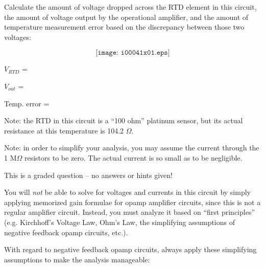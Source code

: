 
Calculate the amount of voltage dropped across the RTD element in this circuit, the amount of voltage output by the operational amplifier, and the amount of temperature measurement error based on the discrepancy between those two voltages:

$$\texttt{[image: i00041x01.eps]}$$

$V_{RTD}$ = \underbar{\hskip 50pt}

\vskip 10pt

$V_{out}$ = \underbar{\hskip 50pt}

\vskip 10pt

Temp. error = \underbar{\hskip 50pt}

\vskip 20pt

Note: the RTD in this circuit is a ``100 ohm'' platinum sensor, but its actual resistance at this temperature is 104.2 $\Omega$.

\vfil 

Note: in order to simplify your analysis, you may assume the current through the 1 M$\Omega$ resistors to be zero.  The actual current is so small as to be negligible.

\eject






This is a graded question -- no answers or hints given!







You will {\it not} be able to solve for voltages and currents in this circuit by simply applying memorized gain formulae for opamp amplifier circuits, since this is not a regular amplifier circuit.  Instead, you must analyze it based on ``first principles'' (e.g. Kirchhoff's Voltage Law, Ohm's Law, the simplifying assumptions of negative feedback opamp circuits, etc.).

\vskip 10pt

With regard to negative feedback opamp circuits, always apply these simplifying assumptions to make the analysis manageable:

